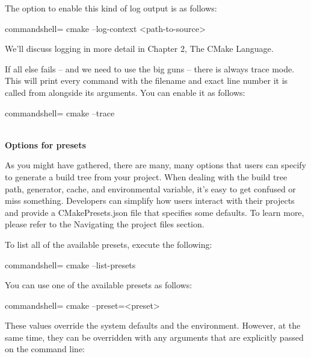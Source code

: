 The option to enable this kind of log output is as follows:

\begin{tcblisting}{commandshell={}}
cmake --log-context <path-to-source>
\end{tcblisting}

We'll discuss logging in more detail in Chapter 2, The CMake Language.

If all else fails – and we need to use the big guns – there is always trace mode. This will print every command with the filename and exact line number it is called from alongside its arguments. You can enable it as follows:

\begin{tcblisting}{commandshell={}}
cmake --trace
\end{tcblisting}

\hspace*{\fill} \\ %
\noindent
\textbf{Options for presets}

As you might have gathered, there are many, many options that users can specify to generate a build tree from your project. When dealing with the build tree path, generator, cache, and environmental variable, it's easy to get confused or miss something. Developers can simplify how users interact with their projects and provide a CMakePresets.json file that specifies some defaults. To learn more, please refer to the Navigating the project files section.

To list all of the available presets, execute the following:

\begin{tcblisting}{commandshell={}}
cmake --list-presets
\end{tcblisting}

You can use one of the available presets as follows:

\begin{tcblisting}{commandshell={}}
cmake --preset=<preset>
\end{tcblisting}

These values override the system defaults and the environment. However, at the same time, they can be overridden with any arguments that are explicitly passed on the command line:

